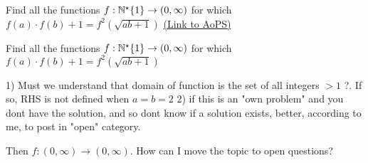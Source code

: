 \begin{problem}
	Find all the functions $f:\Bbb{N}^\star\/\{1\}\rightarrow (0,\infty)$ for which $f(a)\cdot f(b)+1=f^2\left( \sqrt{ab+1} \right ) $
	\flushright \href{https://artofproblemsolving.com/community/c6h528894}{(Link to AoPS)}
\end{problem}



\begin{solution}
	\begin{tcolorbox}Find all the functions $f:\Bbb{N}^\star\/\{1\}\rightarrow (0,\infty)$ for which $f(a)\cdot f(b)+1=f^2\left( \sqrt{ab+1} \right ) $\end{tcolorbox}
1) Must we understand that domain of function is the set of all integers $>1$ ?. If so, RHS is not defined when $a=b=2$
2) if this is an "own problem" and you dont have the solution, and so dont know if a solution exists, better, according to me, to post in "open" category.
\end{solution}



\begin{solution}
	Then $f:(0,\infty)\rightarrow (0,\infty)$. How can I move the topic to open questions?
\end{solution}



